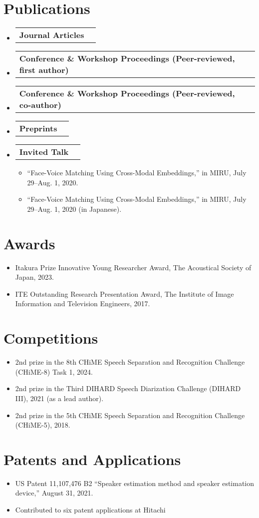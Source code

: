 \documentclass[letterpaper,11pt]{article}
\makeatletter
\newcommand{\resumeItem}[1]{
  \item\small{
    {#1 \vspace{-2pt}}
  }
}
\newcommand{\resumeShortSubheading}[2]{
  \vspace{-2pt}\item
    \begin{tabular*}{0.97\textwidth}[t]{l@{\extracolsep{\fill}}r}
      \textbf{#1} & #2 \\
    \end{tabular*}\vspace{-7pt}
}
\newcommand{\resumeSubHeadingListStart}{\begin{itemize}[leftmargin=0.15in, label={}]}
\newcommand{\resumeSubHeadingListEnd}{\end{itemize}}
\newcommand{\resumeItemListStart}{\begin{itemize}}
\newcommand{\resumeItemListEnd}{\end{itemize}\vspace{-5pt}}
\makeatother
\begin{document}
\section{Publications}
  \resumeSubHeadingListStart
    \resumeShortSubheading
      {Journal Articles}{}
      \nocite{*}
      \printbibliography[type=article,heading=none]
    \resumeShortSubheading
      {Conference \& Workshop Proceedings (Peer-reviewed, first author)}{}
      \printbibliography[type=inproceedings,heading=none,keyword=first]
    \resumeShortSubheading
      {Conference \& Workshop Proceedings (Peer-reviewed, co-author)}{}
      \printbibliography[type=inproceedings,heading=none,notkeyword=first]
    \resumeShortSubheading
      {Preprints}{}
      \printbibliography[type=misc,heading=none]
    \resumeShortSubheading
      {\textbf{Invited Talk}}{}
      \resumeItemListStart
        \resumeItem{``Face-Voice Matching Using Cross-Modal Embeddings,'' in MIRU, July 29--Aug. 1, 2020.}
        \resumeItem{``Face-Voice Matching Using Cross-Modal Embeddings,'' in MIRU, July 29--Aug. 1, 2020 (in Japanese).}
      \resumeItemListEnd
  \resumeSubHeadingListEnd

\section{Awards}
  \resumeItemListStart
    \resumeItem{Itakura Prize Innovative Young Researcher Award, The Acoustical Society of Japan, 2023.}
    \resumeItem{ITE Outstanding Research Presentation Award, The Institute of Image Information and Television Engineers, 2017.}
  \resumeItemListEnd

\section{Competitions}
  \resumeItemListStart
    \resumeItem{2nd prize in the 8th CHiME Speech Separation and Recognition Challenge (CHiME-8) Task 1, 2024.}
    \resumeItem{2nd prize in the Third DIHARD Speech Diarization Challenge (DIHARD III), 2021  (as a lead author).}
    \resumeItem{2nd prize in the 5th CHiME Speech Separation and Recognition Challenge (CHiME-5), 2018.}
  \resumeItemListEnd

\section{Patents and Applications}
  \resumeItemListStart
    \resumeItem{US Patent 11,107,476 B2 ``Speaker estimation method and speaker estimation device,'' August 31, 2021.}
    \resumeItem{Contributed to six patent applications at Hitachi}
  \resumeItemListEnd
  
\end{document}
